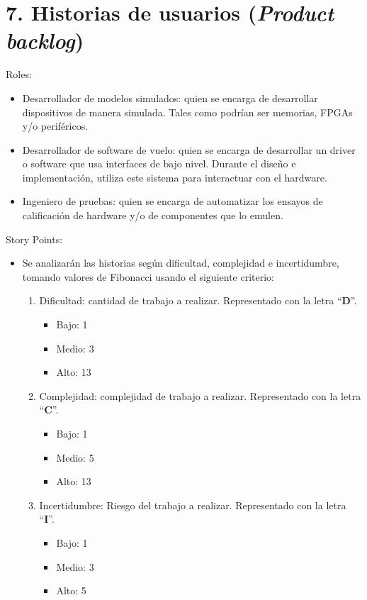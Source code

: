 \section{7. Historias de usuarios (\textit{Product backlog})}
\label{sec:7-historias-de-usuarios-product-backlog}


Roles:

\begin{itemize}
\item Desarrollador de modelos simulados: quien se encarga de desarrollar dispositivos de manera simulada. Tales como podrían ser memorias, FPGAs y/o periféricos.
\item Desarrollador de software de vuelo: quien se encarga de desarrollar un driver o software que usa interfaces de bajo nivel. Durante el diseño e implementación, utiliza este sistema para interactuar con el hardware.
\item Ingeniero de pruebas: quien se encarga de automatizar los ensayos de calificación de hardware y/o de componentes que lo emulen.
\end{itemize}

Story Points:

\begin{itemize}
\item Se analizarán las historias según dificultad, complejidad e incertidumbre, tomando valores de Fibonacci usando el siguiente criterio:
  \begin{enumerate}
  \item Dificultad: cantidad de trabajo a realizar. Representado con la letra ``\textbf{D}''.

	  \begin{itemize}
	  \item Bajo: 1
	  \item Medio: 3
	  \item Alto: 13
	  \end{itemize}

  \item Complejidad: complejidad de trabajo a realizar. Representado con la letra ``\textbf{C}''.

	  \begin{itemize}
	  \item Bajo: 1
	  \item Medio: 5
	  \item Alto: 13
	  \end{itemize}

  \item Incertidumbre: Riesgo del trabajo a realizar. Representado con la letra ``\textbf{I}''.

	  \begin{itemize}
	  \item Bajo: 1
	  \item Medio: 3
	  \item Alto: 5
	  \end{itemize}

  \end{enumerate}

\end{itemize}

